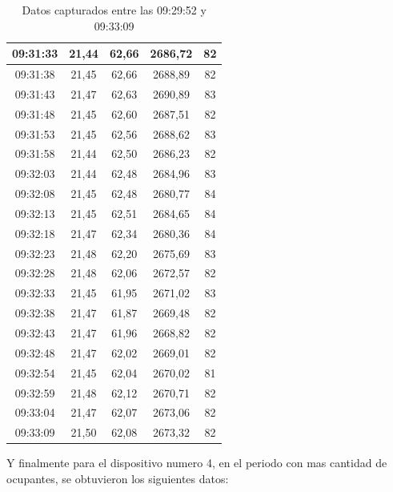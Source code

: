 \documentclass{templateNote}
\begin{document}
\begin{table}[H]
\begin{tabular}{|c|c|c|c|c|}
        09:31:33 & 21,44     & 62,66     & 2686,72   & 82        \\ \hline
        09:31:38 & 21,45     & 62,66     & 2688,89   & 82        \\ \hline
        09:31:43 & 21,47     & 62,63     & 2690,89   & 83        \\ \hline
        09:31:48 & 21,45     & 62,60     & 2687,51   & 82        \\ \hline
        09:31:53 & 21,45     & 62,56     & 2688,62   & 83        \\ \hline
        09:31:58 & 21,44     & 62,50     & 2686,23   & 82        \\ \hline
        09:32:03 & 21,44     & 62,48     & 2684,96   & 83        \\ \hline
        09:32:08 & 21,45     & 62,48     & 2680,77   & 84        \\ \hline
        09:32:13 & 21,45     & 62,51     & 2684,65   & 84        \\ \hline
        09:32:18 & 21,47     & 62,34     & 2680,36   & 84        \\ \hline
        09:32:23 & 21,48     & 62,20     & 2675,69   & 83        \\ \hline
        09:32:28 & 21,48     & 62,06     & 2672,57   & 82        \\ \hline
        09:32:33 & 21,45     & 61,95     & 2671,02   & 83        \\ \hline
        09:32:38 & 21,47     & 61,87     & 2669,48   & 82        \\ \hline
        09:32:43 & 21,47     & 61,96     & 2668,82   & 82        \\ \hline
        09:32:48 & 21,47     & 62,02     & 2669,01   & 82        \\ \hline
        09:32:54 & 21,45     & 62,04     & 2670,02   & 81        \\ \hline
        09:32:59 & 21,48     & 62,12     & 2670,71   & 82        \\ \hline
        09:33:04 & 21,47     & 62,07     & 2673,06   & 82        \\ \hline
        09:33:09 & 21,50     & 62,08     & 2673,32   & 82        \\ \hline
    \end{tabular}
    \caption{Datos capturados entre las 09:29:52 y 09:33:09}
    \label{tab:data3}
\end{table}    

\newpage
\noindent Y finalmente para el dispositivo numero 4, en el periodo con mas cantidad de ocupantes, se obtuvieron los siguientes datos:
\end{document}

